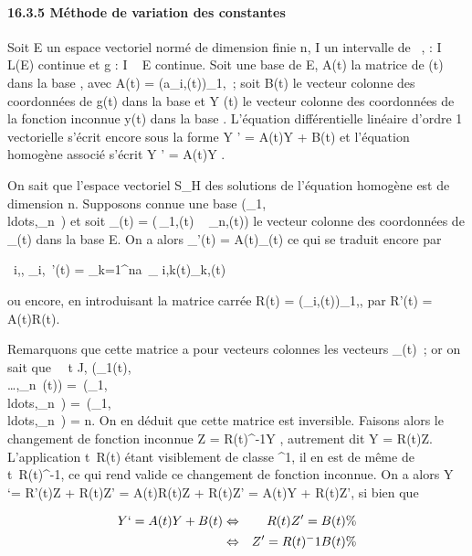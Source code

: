 \documentclass[]{article}
\begin{document}
\paragraph{16.3.5 Méthode de variation des constantes}

Soit E un espace vectoriel normé de dimension finie n, I un intervalle
de ~, \ell : I \rightarrow~ L(E) continue et g : I \rightarrow~ E continue. Soit  une base de E,
A(t) la matrice de \ell(t) dans la base , avec A(t) =
(a\_i,\jmath(t))\_1\leqi,\jmath\leqn~; soit B(t) le vecteur colonne des
coordonnées de g(t) dans la base  et Y (t) le vecteur colonne des
coordonnées de la fonction inconnue y(t) dans la base . L'équation
différentielle linéaire d'ordre 1 vectorielle s'écrit encore sous la
forme Y ' = A(t)Y + B(t) et l'équation homogène associé s'écrit Y ' =
A(t)Y .

On sait que l'espace vectoriel S\_H des solutions de l'équation
homogène est de dimension n. Supposons connue une base
(\phi\_1,\\ldots,\phi\_n~)
et soit \Phi\_\jmath(t) = \left
(\matrix\,\phi\_1,\jmath(t)
\cr \⋮~
\cr \phi\_n,\jmath(t)\right ) le vecteur
colonne des coordonnées de \phi\_\jmath(t) dans la base E. On a alors
\Phi\_\jmath'(t) = A(t)\Phi\_\jmath(t) ce qui se traduit encore par

\forall~i,\jmath, \phi\_i,\jmath~'(t) =
\sum \_k=1^na~\_
i,k(t)\psi\_k,\jmath(t)

ou encore, en introduisant la matrice carrée R(t) =
(\psi\_i,\jmath(t))\_1\leqi,\jmath\leqn, par R'(t) = A(t)R(t).

Remarquons que cette matrice a pour vecteurs colonnes les vecteurs
\Phi\_\jmath(t)~; or on sait que \forall~~t \in J,
\mathrmrg(\Phi\_1(t),\\\ldots,\Phi\_n~(t))
=\
\mathrmrg(\Phi\_1,\\ldots,\Phi\_n~)
=\
\mathrmrg(\phi\_1,\\ldots,\phi\_n~)
= n. On en déduit que cette matrice est inversible. Faisons alors le
changement de fonction inconnue Z = R(t)^-1Y , autrement dit
Y = R(t)Z. L'application t\mapsto~R(t) étant
visiblement de classe \mathcal{C}^1, il en est de même de
t\mapsto~R(t)^-1, ce qui rend valide ce
changement de fonction inconnue. On a alors Y `= R'(t)Z + R(t)Z' =
A(t)R(t)Z + R(t)Z' = A(t)Y + R(t)Z', si bien que

\begin{align*} Y `= A(t)Y + B(t)&
\Leftrightarrow & R(t)Z' = B(t) \%&
\\ & \Leftrightarrow & Z' =
R(t)^-1B(t)\%& \\
\end{align*}
\end{document}
